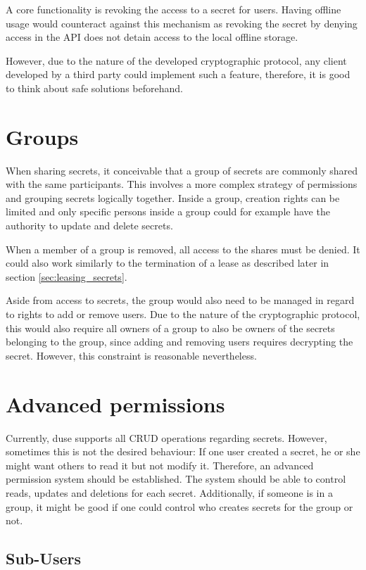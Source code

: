 A core functionality is revoking the access to a secret for users. Having
offline usage would counteract against this mechanism as revoking the secret by
denying access in the API does not detain access to the local offline storage.

However, due to the nature of the developed cryptographic protocol, any client
developed by a third party could implement such a feature, therefore, it is
good to think about safe solutions beforehand.

\section{Groups}

When sharing secrets, it conceivable that a group of secrets are commonly
shared with the same participants. This involves a more complex strategy of
permissions and grouping secrets logically together. Inside a group, creation
rights can be limited and only specific persons inside a group could for
example have the authority to update and delete secrets.

When a member of a group is removed, all access to the shares must be denied.
It could also work similarly to the termination of a lease as described later in
section \ref{sec:leasing_secrets}.

Aside from access to secrets, the group would also need to be managed in regard
to rights to add or remove users. Due to the nature of the cryptographic
protocol, this would also require all owners of a group to also be owners of
the secrets belonging to the group, since adding and removing users requires
decrypting the secret. However, this constraint is reasonable nevertheless.

\section{Advanced permissions}

Currently, duse supports all CRUD operations regarding secrets. However,
sometimes this is not the desired behaviour: If one user created a secret, he
or she might want others to read it but not modify it. Therefore, an advanced
permission system should be established. The system should be able to control
reads, updates and deletions for each secret. Additionally, if someone is in a
group, it might be good if one could control who creates secrets for the group
or not.

\subsection{Sub-Users}

